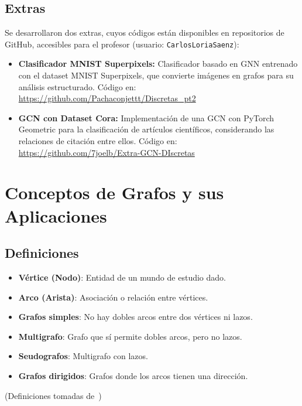 \documentclass[11pt]{article} %
\begin{document}
\vspace{5pt}
\subsection{Extras}
\vspace{-3pt}
Se desarrollaron dos extras, cuyos códigos están disponibles en repositorios de GitHub, accesibles para el profesor (usuario: \texttt{CarlosLoriaSaenz}):

\begin{itemize}\setlength\itemsep{1pt}
    \item \textbf{Clasificador MNIST Superpixels:}  
    Clasificador basado en GNN entrenado con el dataset MNIST Superpixels, que convierte imágenes en grafos para su análisis estructurado. Código en:  
    \url{https://github.com/Pachaconjettt/Discretas_pt2}

    \item \textbf{GCN con Dataset Cora:}  
    Implementación de una GCN con PyTorch Geometric para la clasificación de artículos científicos, considerando las relaciones de citación entre ellos. Código en:  
    \url{https://github.com/7joelb/Extra-GCN-DIscretas}
\end{itemize}



\newpage
\section{Conceptos de Grafos y sus Aplicaciones}

\subsection{Definiciones}
\begin{itemize}
 \item \textbf{Vértice (Nodo)}: Entidad de un mundo de estudio dado.
 \item \textbf{Arco (Arista)}: Asociación o relación entre vértices.
 \item \textbf{Grafos simples}: No hay dobles arcos entre dos vértices ni lazos.
 \item \textbf{Multigrafo}: Grafo que sí permite dobles arcos, pero no lazos.
 \item \textbf{Seudografos}: Multigrafo con lazos.
 \item \textbf{Grafos dirigidos}: Grafos donde los arcos tienen una dirección.
\end{itemize}
\noindent (Definiciones tomadas de~\cite{carlosloria})
\end{document}
